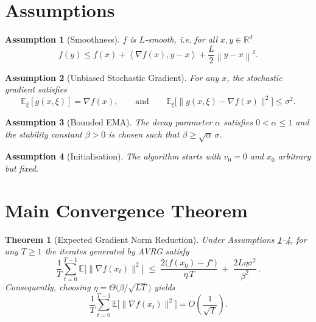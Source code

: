 \documentclass[11pt]{article}
\newtheorem{theorem}{Theorem}
\newtheorem{assumption}{Assumption}
\newcommand{\E}{\mathbb{E}}
\newcommand{\R}{\mathbb{R}}
\newcommand{\norm}[1]{\left\lVert#1\right\rVert}
\newcommand{\inner}[2]{\left\langle #1,#2\right\rangle}
\newcommand{\grad}{\nabla}
\begin{document}
\newpage
\section*{Assumptions}
\begin{assumption}[Smoothness]\label{ass:smooth}
$f$ is $L$‑smooth, i.e. for all $x,y\in\R^{d}$
\[
f(y)\le f(x)+\inner{\grad f(x)}{y-x}+\frac{L}{2}\norm{y-x}^{2}.
\]
\end{assumption}
\begin{assumption}[Unbiased Stochastic Gradient]\label{ass:unbiased}
For any $x$, the stochastic gradient satisfies
\[
\E_{\xi}[g(x,\xi)] = \grad f(x),\qquad 
\text{and}\qquad 
\E_{\xi}\!\big[\|g(x,\xi)-\grad f(x)\|^{2}\big]\le\sigma^{2}.
\]
\end{assumption}
\begin{assumption}[Bounded EMA]\label{ass:bound}
The decay parameter $\alpha$ satisfies $0<\alpha\le 1$ and the stability constant $\beta>0$ is chosen such that $\beta\ge \sqrt{\alpha}\,\sigma$.
\end{assumption}
\begin{assumption}[Initialisation]\label{ass:init}
The algorithm starts with $v_{0}=0$ and $x_{0}$ arbitrary but fixed.
\end{assumption}

\section*{Main Convergence Theorem}
\begin{theorem}[Expected Gradient Norm Reduction]\label{thm:main}
Under Assumptions \ref{ass:smooth}–\ref{ass:init}, for any $T\ge 1$ the iterates generated by AVRG satisfy
\[
\frac{1}{T}\sum_{t=0}^{T-1}\E\!\big[\|\grad f(x_{t})\|^{2}\big]
\;\le\;
\frac{2\big(f(x_{0})-f^{\star}\big)}{\eta\,T}
\;+\;
\frac{2L\eta\sigma^{2}}{\beta^{2}}\, .
\]
Consequently, choosing $\eta = \Theta\!\big(\beta/\sqrt{LT}\big)$ yields
\[
\frac{1}{T}\sum_{t=0}^{T-1}\E\!\big[\|\grad f(x_{t})\|^{2}\big]
= O\!\left(\frac{1}{\sqrt{T}}\right).
\]
\end{theorem}
\end{document}
